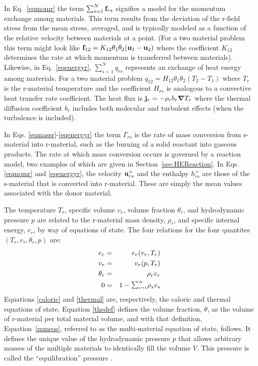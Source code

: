 In Eq.~\ref{eqmomr} the term $\sum_{s=1}^{N}\mathbf{f}_{rs}$ signifies a
model for the momentum exchange among materials.  This term results from
the deviation of the r-field stress from the mean stress, averaged, and
is typically modeled as a function of the relative velocity between
materials at a point. (For a two material problem this term might look
like $\mathbf{f}_{12} = K_{12}\theta_1\theta_2(\mathbf{u}_1 - \mathbf{u}_2)$ where the
coefficient $K_{12}$ determines the rate at which momentum is transferred
between materials).  Likewise, in Eq.~\ref{eqenergyr},
$\sum_{s=1}^{N} q_{rs}$ represents an exchange of heat energy
among materials.  For a two material problem 
$q_{12} = H_{12}\theta_1\theta_2(T_2 - T_1)$ where $T_r$ is the
r-material temperature and the coefficient $H_{rs}$ is analogous to
a convective heat transfer rate coefficient.  The heat flux is
$\mathbf{j}_r = -\rho_r b_r \boldsymbol{\nabla} T_r$ where the thermal
diffusion coefficient $b_r$ includes both
molecular and turbulent effects (when the turbulence is included).

In Eqs. \ref{eqmassr}-\ref{eqenergyr} the term $\Gamma_{rs}$
is the rate of mass conversion from s-material into r-material, such as
the burning of a solid reactant into gaseous products.  The 
rate at which mass conversion occurs is governed by a reaction model,
two examples of which are given in Section~\ref{sec:HEReaction}.
In Eqs. \ref{eqmomr} and \ref{eqenergyr}, the velocity
$\mathbf{u}_{rs}^+$ and the enthalpy
$h_{rs}^+$ are those of the s-material that is converted into r-material.
These are simply the mean values associated with the donor material.

The temperature $T_r$, specific volume $v_r$, volume fraction
$\theta_r$, and hydrodynamic pressure $p$ are
related to the r-material mass density, $\rho_r$, and specific internal energy,
$e_r$, by way of equations of state.  The four relations for the four
quantites $(T_r, v_r, \theta_r, p)$ are:
\begin{eqnarray}
e_r &=& e_r(v_r, T_r) \label{caloric} \\
v_r &=& v_r(p, T_r) \label{thermal} \\
\theta_r &=& \rho_r v_r \label{thedef} \\
0 &=& 1 - {\raise1.5pt\hbox{$\scriptstyle\sum_{s=1}^N$}}\rho_s v_s
\label{mmeos}
\end{eqnarray}
Equations \ref{caloric} and \ref{thermal} are, respectively, the caloric and 
thermal equations of state.  Equation \ref{thedef} defines the volume 
fraction, $\theta$, as the volume of r-material per total material volume,
and with that definition, Equation~\ref{mmeos}, referred to as the 
multi-material equation of state, follows.  It 
defines the unique value of the hydrodynamic pressure $p$ that allows 
arbitrary masses of the multiple materials to identically fill the 
volume $V$.  This pressure is called the ``equilibration'' 
pressure \cite{Kashiwa1994}.

